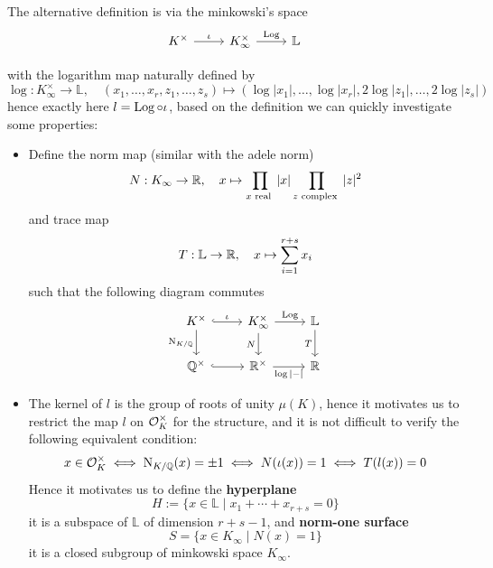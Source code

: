     \begin{remark}
        The alternative definition is via the minkowski's space
\[\begin{tikzcd}
	K^\times & {K^\times_{\infty}} & {\mathbb{L}}
	\arrow["\iota", from=1-1, to=1-2]
	\arrow["\Log", from=1-2, to=1-3]
\end{tikzcd}\]

with the logarithm map naturally defined by
\[\log: K^\times_{\infty} \to \mathbb{L}, \quad (x_1,\dots,x_r,z_1,\dots,z_s) \mapsto (\log|x_1|,\dots,\log|x_r|,2\log|z_1|,\dots,2\log|z_s|)\]
hence exactly here \(l = \operatorname{Log} \circ \iota\), based on the definition we can quickly investigate some properties:
\begin{itemize}
    
    \item Define the norm map (similar with the adele norm)
    \[N: K_{\infty} \to \mathbb{R}, \quad x \mapsto \prod_{x \text{ real }}|x| \prod_{z \text{ complex }} |z|^2 \]
    and trace map
    \[T: \mathbb{L} \to \mathbb{R}, \quad x \mapsto \sum_{i=1}^{r+s} x_i\]
    such that the following diagram commutes
\[\begin{tikzcd}
	{K^\times} & {K_{\infty}^\times} & {\mathbb{L}} \\
	{\mathbb{Q}^\times} & {\mathbb{R}^\times} & {\mathbb{R}}
	\arrow["\iota", hook, from=1-1, to=1-2]
	\arrow["{\mathrm{N}_{K/\mathbb{Q}}}"', from=1-1, to=2-1]
	\arrow["\Log", from=1-2, to=1-3]
	\arrow["N"', from=1-2, to=2-2]
	\arrow["T"', from=1-3, to=2-3]
	\arrow[hook, from=2-1, to=2-2]
	\arrow["{\log|-|}"', from=2-2, to=2-3]
\end{tikzcd}\]

\item The kernel of \(l\) is the group of roots of unity  \(\mu(K)\), hence it motivates us to restrict the map \(l\) on \(\mathcal{O}_K^\times\) for the structure, and it is not difficult to verify the following equivalent condition:
    \[x \in \mathcal{O}_K^\times \iff \mathrm{N}_{K/\mathbb{Q}}(x) = \pm 1 \iff N(\iota(x)) =  1 \iff T(l(x)) = 0\]
    Hence it motivates us to define the \textbf{hyperplane}
    \[H := \{x \in \mathbb{L} \mid x_1 + \cdots + x_{r+s} = 0\} \]
    it is a subspace of \(\mathbb{L}\) of dimension \(r+s-1\), and \textbf{norm-one surface}
    \[S = \{x \in K_\infty \mid N(x) = 1\}\]
    it is a closed subgroup of minkowski space \(K_{\infty }\).
    
\end{itemize}

    \end{remark}

